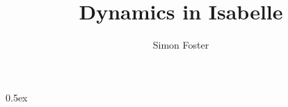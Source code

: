 \documentclass[11pt,a4paper]{article}
\begin{document}
\title{Dynamics in Isabelle}

\author{Simon Foster}

\maketitle

\tableofcontents

\parindent 0pt\parskip 0.5ex









\end{document}
